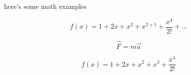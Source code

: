 \documentclass{article}
\begin{document}
here's some math examples

$$
f(x) = 1 + 2x + x^2 + x^{2+1} + \frac{x^4}{2!} + ...
$$

$$
\vec{F} = m\vec{a}
$$

$$
f(x) = 1 + 2x + x^2 + x^3 + \frac{x^4}{2!}
$$
\end{document}
